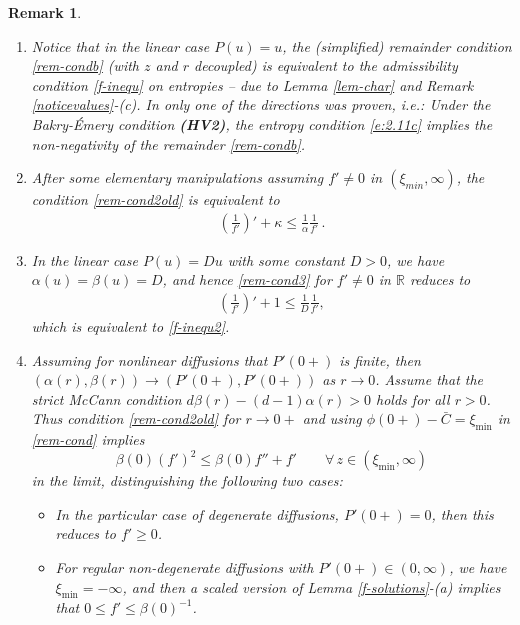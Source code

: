 \documentclass[reqno]{amsart}
\newtheorem{remark}[lemma]{Remark}
\newcommand{\R}{\mathbb{R}}
\begin{document}
\begin{remark}\label{remlin}\
    \begin{enumerate}
     \item[(a)] Notice that in the linear case $P(u)=u$, the (simplified) remainder condition \eqref{rem-condb} (with $z$ and $r$ decoupled) is equivalent to the admissibility condition \eqref{f-inequ} on entropies -- due to Lemma \ref{lem-char} and Remark \ref{noticevalues}-(c). In \cite{AMTU,BaEm84} only one of the directions was proven, i.e.: Under the Bakry-\'Emery condition {\bf (HV2)}, the entropy condition \eqref{e:2.11c} implies the non-negativity of the remainder \eqref{rem-condb}.
    \item[(b)]   After some elementary manipulations assuming $f'\neq0$ in $(\xi_{min},\infty)$, the condition \eqref{rem-cond2old} is equivalent to
       \begin{align}
    \label{rem-cond3}
    \left(\frac1{f'}\right)' + \kappa \le \frac1\alpha\frac1{f'}\,.
  \end{align}
    \item[(c)] In the linear case $P(u)=Du$ with some constant $D>0$, we have $\alpha(u)=\beta(u)=D$, and hence \eqref{rem-cond3} for $f'\neq 0$ in $\R$ reduces to
      \begin{align}\label{condD}
        \left(\frac1{f'}\right)' + 1 \le \frac1D\frac1{f'},
      \end{align}
      which is equivalent to  \eqref{f-inequ2}.
       \item[(d)] Assuming for nonlinear diffusions that $P'(0+)$ is finite, then $(\alpha(r),\beta(r))\to (P'(0+),P'(0+))$ as $r\to 0$. Assume that the strict McCann condition $d\beta(r)-(d-1)\alpha(r)>0$ holds for all $r >0$. Thus condition \eqref{rem-cond2old} for $r\to 0+$ and using $\phi(0+)-\bar C=\xi_{\min}$ in \eqref{rem-cond} implies 
       $$
       \beta(0) (f')^2 \leq \beta(0) f'' + f'\qquad \forall\,z\in (\xi_{\min},\infty)
       $$
       in the limit, distinguishing the following two cases:   
       \begin{itemize}
           \item In the particular case of degenerate diffusions, $P'(0+)=0$, then this reduces to $f'\ge 0$.
           
           \item  For regular non-degenerate diffusions with $P'(0+)\in(0,\infty)$, we have $\xi_{\min}=-\infty$, and then a scaled version of Lemma \ref{f-solutions}-(a) implies that $0\leq f'\leq \beta(0)^{-1}$. 
           

\end{itemize}
\end{enumerate}
\end{remark}
\end{document}
